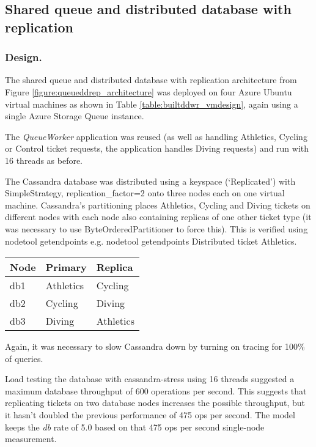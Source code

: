 %
%
\FloatBarrier
\subsection{Shared queue and distributed database with replication}

\subsubsection{Design.}  The shared queue and distributed database with replication architecture from Figure \ref{figure:queueddrep_architecture} was deployed on four Azure Ubuntu virtual machines as shown in Table \ref{table:builtddwr_vmdesign}, again using a single Azure Storage Queue instance.

The {\itshape QueueWorker} application was reused (as well as handling Athletics, Cycling or Control ticket requests, the application handles Diving requests) and run with 16 threads as before.

The Cassandra database was distributed using a keyspace (`Replicated') with SimpleStrategy, replication\_factor=2 onto three nodes each on one virtual machine.  Cassandra's partitioning places Athletics, Cycling and Diving tickets on different nodes with each node also containing replicas of one other ticket type (it was necessary to use ByteOrderedPartitioner to force this).  This is verified using nodetool getendpoints e.g. nodetool getendpoints Distributed ticket Athletics.

\begin{center}
\begin{tabular}{l | l | l}
	Node	& Primary	& Replica \\
	\hline
	db1		& Athletics	& Cycling \\
	db2		& Cycling	& Diving \\
	db3		& Diving	& Athletics \\
\end{tabular}
\end{center}

Again, it was necessary to slow Cassandra down by turning on tracing for 100\% of queries.

Load testing the database with cassandra-stress using 16 threads suggested a maximum database throughput of 600 operations per second.  This suggests that replicating tickets on two database nodes increases the possible throughput, but it hasn't doubled the previous performance of 475 ops per second.  The model keeps the {\itshape db} rate of 5.0 based on that 475 ops per second single-node measurement.


